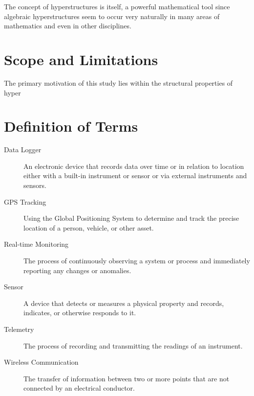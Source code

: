 {The concept of hyperstructures is itself, a powerful mathematical tool since algebraic hyperstructures seem to occur very naturally in many areas of mathematics and even in other disciplines. 

\section{Scope and Limitations}

The primary motivation of this study lies within the structural properties of hyper 

\section{Definition of Terms}

\begin{description}

	\item[Data Logger] 
	An electronic device that records data over time or in relation to location either with a built-in instrument or sensor or via external instruments and sensors.
	
	\item[GPS Tracking] 
	Using the Global Positioning System to determine and track the precise location of a person, vehicle, or other asset.
	
	\item[Real-time Monitoring] 
	The process of continuously observing a system or process and immediately reporting any changes or anomalies.
	
	\item[Sensor] 
	A device that detects or measures a physical property and records, indicates, or otherwise responds to it.
	
	\item[Telemetry] 
	The process of recording and transmitting the readings of an instrument.
	
	\item[Wireless Communication] 
	The transfer of information between two or more points that are not connected by an electrical conductor.

\end{description}

}
